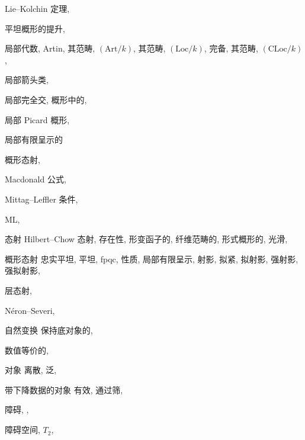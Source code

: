 \begin{theindex}
\item Lie--Kolchin 定理, 
\item 平坦概形的提升, 
\item 局部代数, 
\subitem Artin, 
\subsubitem 其范畴, $(\mathrm{Art}/k)$, 
\subitem 其范畴, $(\mathrm{Loc}/k)$, 
\subitem 完备, 
\subsubitem 其范畴, $(\mathrm{CLoc}/k)$, 
\item 局部箭头类, 
\item 局部完全交, 
\subitem 概形中的, 
\item 局部 Picard 概形, 
\item 局部有限呈示的

\subitem 概形态射, 
\indexspace
\item Macdonald 公式, 
\item Mittag--Leffler 条件, 
\item ML, 
\item 态射
\subitem Hilbert--Chow 态射, 
\subsubitem 存在性, 
\subitem 形变函子的, 
\subitem 纤维范畴的, 
\subitem 形式概形的, 
\subsubitem 光滑, 
\item 概形态射
\subitem 忠实平坦, 
\subitem 平坦, 
\subitem fpqc, 
\subsubitem 性质, 
\subitem 局部有限呈示, 
\subitem 射影, 
\subitem 拟紧, 
\subitem 拟射影, 
\subitem 强射影, 
\subitem 强拟射影, 
\item 层态射, 
\indexspace
\item Néron--Severi, 
\item 自然变换
\subitem 保持底对象的, 
\item 数值等价的, 
\indexspace
\item 对象
\subitem 离散, 
\subitem 泛, 
\item 带下降数据的对象
\subitem 有效, 
\subitem 通过筛, 
\item 障碍, , 
\item 障碍空间, $T_2$, 

\end{theindex}
